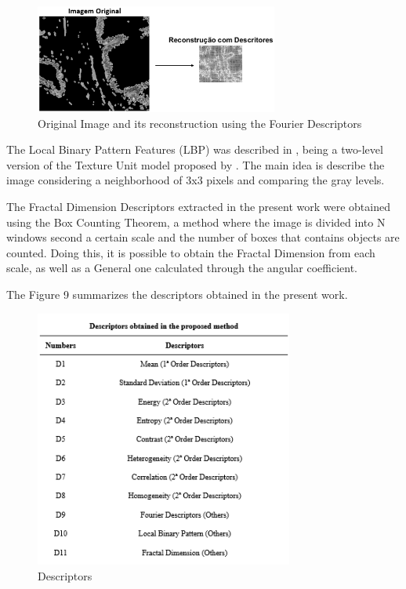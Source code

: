 \documentclass[conference]{IEEEtran}
\begin{document}
\begin{figure}[h]
    \centering
    \includegraphics[width=8cm]{images/imagem_reconstrucao.png}
    \caption{Original Image and its reconstruction using the Fourier Descriptors}
    \label{fig:my_label}
\end{figure}{}
The Local Binary Pattern Features (LBP) was described in \cite{lbp-OjalaPH96}, being a two-level version of the Texture Unit model proposed by \cite{Wang:1990:TCU:83597.83606}. The main idea is describe the image considering a neighborhood of 3x3 pixels and comparing the gray levels.\par
The Fractal Dimension Descriptors extracted in the present work were obtained using the Box Counting Theorem, a method where the image is divided into N windows second a certain scale and the number of boxes that contains objects are counted. Doing this, it is possible to obtain the Fractal Dimension from each scale, as well as a General one calculated through the angular coefficient.\par
The Figure 9 summarizes the descriptors obtained in the present work. 
\begin{figure}[h]
    \centering
    \includegraphics[width=8.5cm]{images/table_descriptors.png}
    \caption{Descriptors}
    \label{fig:my_label}
\end{figure}{}
\end{document}
